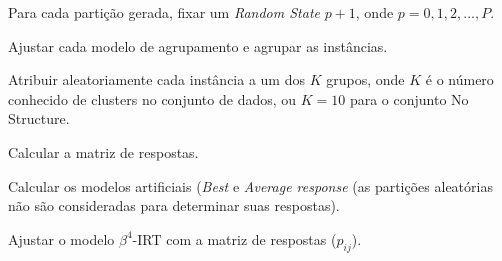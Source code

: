 \begin{algorithm}
\caption{Incorporação de Partições Aleatórias}
\begin{algorithmic}
\State Para cada partição gerada, fixar um \textit{Random State} $p+1$, onde $p = 0, 1, 2, \dots, P$.

    \State Ajustar cada modelo de agrupamento e agrupar as instâncias.
    

    \State Atribuir aleatoriamente cada instância a um dos $K$ grupos, onde $K$ é o número conhecido de clusters no conjunto de dados, ou $K=10$ para o conjunto No Structure.
    
    \State Calcular a matriz de respostas.
    
    \State Calcular os modelos artificiais (\textit{Best} e \textit{Average response} (as partições aleatórias não são consideradas para determinar suas respostas).
    
    \State Ajustar o modelo $\beta^{4}$-\gls{IRT} com a matriz de respostas ($p_{ij}$).
    \EndFor
\EndFor
\end{algorithmic}
\label{alg:random:partitions}
\end{algorithm}